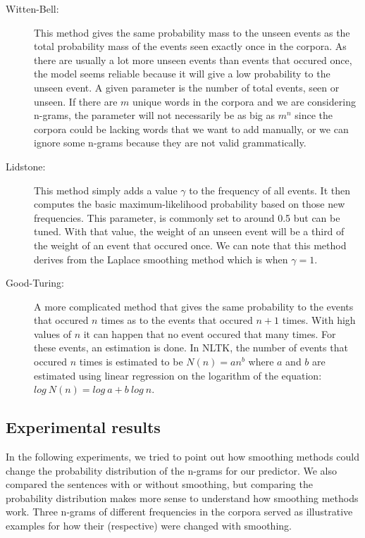 \documentclass[a4paper,12pt]{article}
\begin{document}
	\begin{description}
		\item[Witten-Bell:] This method gives the same probability mass to the unseen events as the total probability mass of the events seen exactly once in the corpora. As there are usually a lot more unseen events than events that occured once, the model seems reliable because it will give a low probability to the unseen event. A given parameter is the number of total events, seen or unseen. If there are $m$ unique words in the corpora and we are considering n-grams, the parameter will not necessarily be as big as $m^n$ since the corpora could be lacking words that we want to add manually, or we can ignore some n-grams because they are not valid grammatically.
		\item[Lidstone:] This method simply adds a value $\gamma$ to the frequency of all events. It then computes the basic maximum-likelihood probability based on those new frequencies. This parameter, is commonly set to around 0.5 but can be tuned. With that value, the weight of an unseen event will be a third of the weight of an event that occured once. We can note that this method derives from the Laplace smoothing method which is when $\gamma = 1$.
		\item[Good-Turing:] A more complicated method that gives the same probability to the events that occured $n$ times as to the events that occured $n+1$ times. With high values of $n$ it can happen that no event occured that many times. For these events, an estimation is done. In NLTK, the number of events that occured $n$ times is estimated to be $N(n) = an^b$ where $a$ and $b$ are estimated using linear regression on the logarithm of the equation: $log\ N(n) = log\ a + b\ log\ n$.
	\end{description}
	
	\subsection{Experimental results}
	
	In the following experiments, we tried to point out how smoothing methods could change the probability distribution of the n-grams for our predictor. We also compared the sentences with or without smoothing, but comparing the probability distribution makes more sense to understand how smoothing methods work. Three n-grams of different frequencies in the corpora served as illustrative examples for how their (respective) were changed with smoothing.
	
\end{document}
